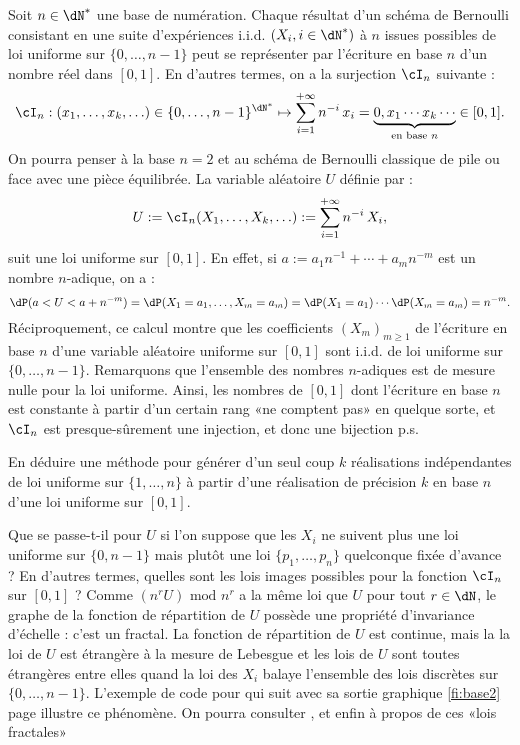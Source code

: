 Soit $n\in\dN^*$ une base de numération.  Chaque résultat d'un schéma de
Bernoulli consistant en une suite d'expériences i.i.d. $(X_i,i\in\dN^*)$ à $n$
issues possibles de loi uniforme sur $\{0,\ldots,n-1\}$ peut se représenter
par l'écriture en base $n$ d'un nombre réel dans $[0,1]$. En d'autres termes,
on a la surjection $\cI_n$ suivante :
$$
\cI_n: (x_1,\ldots,x_k,\ldots)\in\{0,\ldots,n-1\}^{\dN^*} 
\mapsto \sum_{i=1}^{+\infty} n^{-i}\,x_i 
= \underbrace{0,x_1\cdots x_k\cdots}_{\text{en base }n} \in [0,1].
$$
On pourra penser à la base $n=2$ et au schéma de Bernoulli classique de pile ou face
avec une pièce équilibrée. La variable aléatoire $U$ définie par :
$$
U:=\cI_n(X_1,\ldots,X_k,\ldots):=\sum_{i=1}^{+\infty} n^{-i}\,X_i,
$$
suit une loi uniforme sur $[0,1]$.  
En effet, si $a:=a_1 n^{-1}+\cdots+a_m n^{-m}$ est un nombre $n$-adique, on a :
$$
\dP( a < U < a+n^{-m})
=
\dP( X_1 = a_1,\ldots,X_m=a_m)
=
\dP( X_1 = a_1) \cdots \dP(X_m=a_m)
=
n^{-m}.
$$
Réciproquement, ce calcul montre que les coefficients $(X_m)_{m\geq 1}$ de
l'écriture en base $n$ d'une variable aléatoire uniforme sur $[0,1]$ sont
i.i.d. de loi uniforme sur $\{0,\ldots,n-1\}$. Remarquons que l'ensemble des
nombres $n$-adiques est de mesure nulle pour la loi uniforme. Ainsi, les
nombres de $[0,1]$ dont l'écriture en base $n$ est constante à partir d'un
certain rang «ne comptent pas» en quelque sorte, et $\cI_n$ est
presque-sûrement une injection, et donc une bijection p.s.

\begin{exo}
  En déduire une méthode pour générer d'un seul coup $k$ réalisations
  indépendantes de loi uniforme sur $\{1,\ldots,n\}$ à partir d'une
  réalisation de précision $k$ en base $n$ d'une loi uniforme sur $[0,1]$.
\end{exo}

Que se passe-t-il pour $U$ si l'on suppose que les $X_i$ ne suivent plus une
loi uniforme sur $\{0,n-1\}$ mais plutôt une loi $\{p_1,\ldots,p_n\}$ quelconque fixée
d'avance ? En d'autres termes, quelles sont les lois images possibles pour la
fonction $\cI_n$ sur $[0,1]$ ?  Comme $(n^rU)\text{ mod } n^r$ a la même loi
que $U$ pour tout $r\in\dN$, le graphe de la fonction de répartition de $U$
possède une propriété d'invariance d'échelle : c'est un fractal. La fonction
de répartition de $U$ est continue, mais la la loi de $U$ est étrangère à la
mesure de Lebesgue et les lois de $U$ sont toutes étrangères entre elles quand
la loi des $X_i$ balaye l'ensemble des lois discrètes sur $\{0,\ldots,n-1\}$.
L'exemple de code pour \OC{} qui suit avec sa sortie graphique \ref{fi:base2}
page \pageref{fi:base2} illustre ce phénomène. On pourra consulter \cite[exe.
3.3.15 page 81]{dacunha-castelle-duflo}, \cite[expl. IV.3.6.iii pages 100-103
et V.5.3 page 144]{barbe-ledoux} et enfin \cite[exe. V.6.15 page
155]{barbe-ledoux} à propos de ces «lois fractales»


